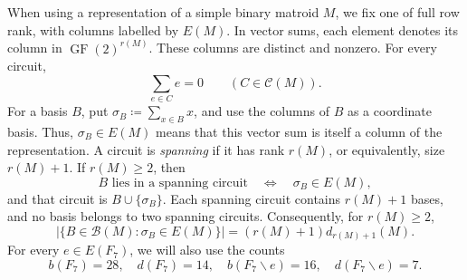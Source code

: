 \documentclass[11pt]{article}
\numberwithin{equation}{section}
\DeclareMathOperator{\GF}{GF}
\newcommand{\BB}{\mathcal B}
\newcommand{\CC}{\mathcal C}
\newcommand{\FF}{\GF(2)}
\begin{document}
When using a representation of a simple binary matroid \(M\),
we fix one of full row rank, with columns labelled by \(E(M)\).
In vector sums, each element denotes its column in \(\FF^{r(M)}\).
These columns are distinct and nonzero. For every circuit,
\begin{equation}\label{eq:circuit-column-sum}
 \sum_{e\in C}e=0\qquad(C\in\CC(M)).
\end{equation}
For a basis \(B\), put \(\sigma_B\coloneqq\sum_{x\in B}x\),
and use the columns of \(B\) as a coordinate basis.
Thus, \(\sigma_B\in E(M)\) means that this vector sum is itself
a column of the representation.
A circuit is \emph{spanning} if it has rank \(r(M)\), or
equivalently, size \(r(M)+1\).
If \(r(M)\ge2\), then
\begin{equation}\label{eq:spanning-bases}
 B\text{ lies in a spanning circuit}
 \quad\Longleftrightarrow\quad \sigma_B\in E(M),
\end{equation}
and that circuit is \(B\cup\{\sigma_B\}\).
Each spanning circuit contains \(r(M)+1\) bases,
and no basis belongs to two spanning circuits.
Consequently, for \(r(M)\ge2\),
\begin{equation}\label{eq:spanning-basis-count}
 \bigl|\{B\in\BB(M):\sigma_B\in E(M)\}\bigr|
 =(r(M)+1)d_{r(M)+1}(M).
\end{equation}
For every \(e\in E(F_7)\), we will also use the counts
\begin{equation}\label{eq:fano}
 b(F_7)=28,\quad d(F_7)=14,\quad
 b(F_7\backslash e)=16,\quad d(F_7\backslash e)=7.
\end{equation}
\end{document}
